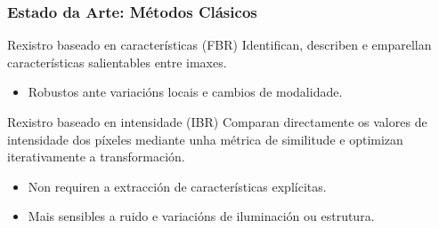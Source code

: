 \documentclass[xcolor=dvipsnames]{beamer}
\begin{document}
\begin{frame}
\frametitle{Estado da Arte: Métodos Clásicos}
\begin{block}{Rexistro baseado en características (FBR)}
Identifican, describen e emparellan características salientables entre imaxes.
\begin{itemize}
\item Robustos ante variacións locais e cambios de modalidade.
\end{itemize}
\end{block}

\begin{block}{Rexistro baseado en intensidade (IBR)}
    Comparan directamente os valores de intensidade dos píxeles mediante unha métrica de similitude e optimizan iterativamente a transformación.
    \begin{itemize}
        \item  Non requiren a extracción de características explícitas.
        \item  Mais sensibles a ruido e variacións de iluminación ou estrutura.
    \end{itemize}
\end{block}




\end{frame}
\end{document}
